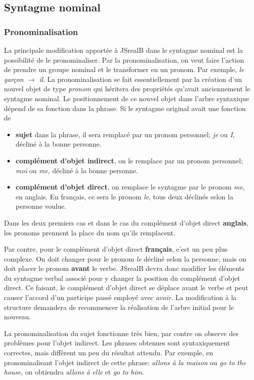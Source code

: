 \documentclass[11pt]{article} %
\newcommand{\system}[1]{\textsf{#1}}
\newcommand{\JSB}{\system{JSrealB}}
\begin{document}
\subsection{Syntagme nominal}

\subsubsection{Pronominalisation}
\label{pronomi}

La principale modification apportée à \JSB{} dans le syntagme nominal
est la possibilité de le pronominaliser. Par la pronominalisation,
on veut faire l'action de prendre un groupe nominal et le transformer
en un pronom. Par exemple, \emph{le garçon $\rightarrow$ il}. La
pronominalisation se fait essentiellement par la création d'un nouvel
objet de type \emph{pronom} qui héritera des propriétés qu'avait anciennement
le syntagme nominal. Le positionnement de ce nouvel objet
dans l'arbre syntaxique dépend de sa fonction dans la phrase. Si le syntagme
original avait une fonction de
\begin{itemize}
\item \textbf{sujet} dans la phrase, il sera remplacé par un pronom 
personnel; \emph{je }ou \emph{I}, décliné à la bonne personne.
\item \textbf{complément d'objet indirect}, on le remplace par un pronom
personnel; \emph{moi }ou \emph{me, }décliné à la bonne personne.
\item \textbf{complément d'objet
direct}, on remplace le syntagme par le pronom \emph{me}, en anglais. En français,
ce sera le pronom \emph{le}, tous deux déclinés selon la personne voulue.
\end{itemize}
Dans les deux premiers cas et dans le cas du complément d'objet direct \textbf{anglais},
les pronoms prennent la place du nom qu'ils remplacent.

Par contre, pour le complément d'objet direct \textbf{français}, c'est un peu plus complexe.
On doit changer pour le pronom \emph{le}
décliné selon la personne, mais on doit placer le pronom \textbf{avant} le
verbe. \JSB{} devra donc modifier les éléments du syntagme verbal
associé pour y changer la position du complément d'objet direct. Ce
faisant, le complément d'objet direct se déplace avant le verbe et
peut causer l'accord d'un participe passé employé avec \emph{avoir.
}La modification à la structure demandera de recommencer la réalisation
de l'arbre initial pour le nouveau.

La pronominalisation
du sujet fonctionne très bien, par contre on observe
des problèmes pour l'objet indirect. Les phrases obtenues sont
syntaxiquement correctes, mais diffèrent un peu du résultat attendu.
Par exemple, en pronominalisant l'objet indirect de cette phrase:
\emph{allons à la maison} ou \emph{go to the house, }on obtiendra
\emph{allons à elle }et \emph{go to him}. 
\end{document}
